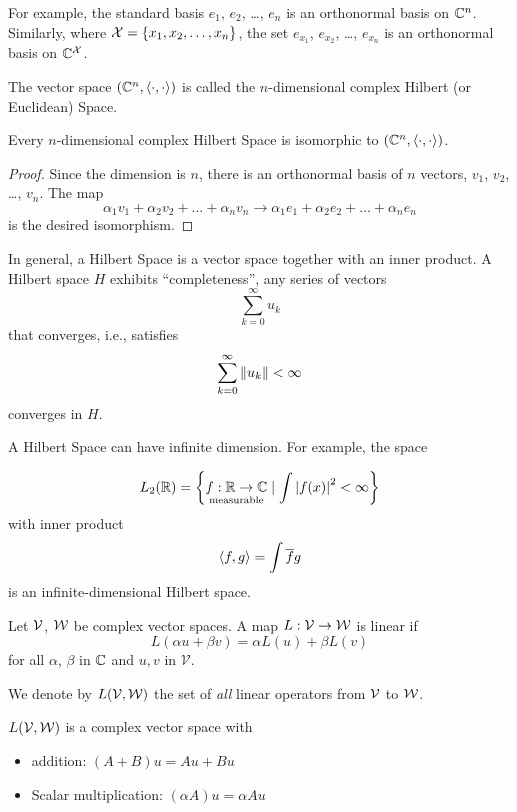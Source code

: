 For example, the standard basis $e_1$, $e_2$, \dots, $e_n$ is an orthonormal basis on $\mathbb{C}^n$.
Similarly, where $\mathcal{X} = \left\lbrace x_1, x_2, \dots, x_n\right\rbrace$, the set $e_{x_1}$, $e_{x_2}$, \dots, $e_{x_n}$
is an orthonormal basis on $\mathbb{C}^{\mathcal{X}}$.

The vector space $(\mathbb{C}^n, \left\langle \cdot, \cdot\right\rangle)$ is called the $n$-dimensional
complex Hilbert (or Euclidean) Space.

\begin{theorem}
    Every $n$-dimensional complex Hilbert Space is isomorphic to $(\mathbb{C}^n, \left\langle \cdot, \cdot\right\rangle)$.
\end{theorem}

\begin{proof}
    Since the dimension is $n$, there is an orthonormal basis of $n$ vectors,
    $v_1$, $v_2$, \dots, $v_n$. The map
    \[\alpha_1 v_1 + \alpha_2 v_2 + \dots + \alpha_n v_n \to \alpha_1 e_1 + \alpha_2 e_2 + \dots + \alpha_n e_n\]
    is the desired isomorphism.
\end{proof}

In general, a Hilbert Space is a vector space together with an inner product. A Hilbert space $H$
exhibits ``completeness'', any series of vectors
\[\sum_{k=0}^{\infty} u_k\]
that converges, i.e., satisfies
\[\sum_{k=0}^{\infty}\left\lVert u_k\right\rVert < \infty\]
converges in $H$.

A Hilbert Space can have infinite dimension. For example, the space

\[L_2(\mathbb{R}) = \left\lbrace\underset{\text{measurable}}{f:\mathbb{R}\to\mathbb{C}} \mid \int \left\lvert f(x)\right\rvert^2 < \infty\right\rbrace\]
with inner product
\[\left\langle f, g\right\rangle = \int\overline{f}g\]
is an infinite-dimensional Hilbert space.

\begin{definition}
    Let $\mathcal{V}$, $\mathcal{W}$ be complex vector spaces. A map $L:\mathcal{V}\to\mathcal{W}$ is
    linear if
    \[L(\alpha u + \beta v) = \alpha L(u) + \beta L(v)\]
    for all $\alpha$, $\beta$ in $\mathbb{C}$ and $u, v$ in $\mathcal{V}$.
\end{definition}

We denote by $L(\mathcal{V}, \mathcal{W})$ the set of \emph{all} linear operators
from $\mathcal{V}$ to $\mathcal{W}$.

$L(\mathcal{V}, \mathcal{W})$ is a complex vector space with
\begin{itemize}
    \item addition: $(A + B)u = Au + Bu$
    \item Scalar multiplication: $(\alpha A)u = \alpha Au$
\end{itemize}

